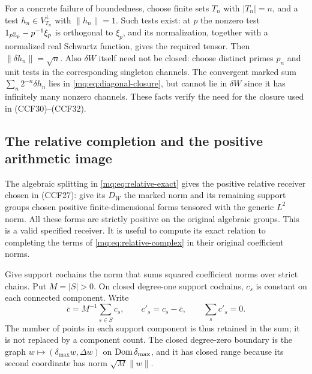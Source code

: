 For a concrete failure of boundedness, choose finite sets $T_n$
with $|T_n|=n$, and a test $h_n\in V_{T_n}^\perp$ with
$\|h_n\|=1$. Such tests exist: at $p$ the nonzero test
$1_{p\mathbb Z_p}-p^{-1}\xi_p$ is orthogonal to $\xi_p$, and its
normalization, together with a normalized real Schwartz function,
gives the required tensor. Then $\|\delta h_n\|=\sqrt n$.
Also $\delta W$ itself need not be closed: choose distinct primes
$p_n$ and unit tests in the corresponding singleton channels.
The convergent marked sum $\sum_n2^{-n}\delta h_n$ lies in
\eqref{mq:eq:diagonal-closure}, but cannot lie in $\delta W$ since
it has infinitely many nonzero channels. These facts verify the
need for the closure used in (CCF30)--(CCF32).

\subsection{The relative completion and the positive arithmetic image}

The algebraic splitting in \eqref{mq:eq:relative-exact} gives the
positive relative receiver chosen in (CCF27): give its $D_W$ the
marked norm and its remaining support groups chosen positive
finite-dimensional forms tensored with the generic $L^2$ norm.
All these forms are strictly positive on the original algebraic
groups. This is a valid specified receiver. It is useful to compute
its exact relation to completing the terms of
\eqref{mq:eq:relative-complex} in their original coefficient norms.

Give support cochains the norm that sums squared coefficient norms
over strict chains. Put $M=|S|>0$. On closed degree-one support
cochains, $c_s$ is constant on each connected component. Write
\[
 \bar c=M^{-1}\sum_{s\in S}c_s,\qquad
 c'_s=c_s-\bar c,\qquad \sum_sc'_s=0.
 \tag{MQ23}\label{mq:eq:support-mean}
\]
The number of points in each support component is thus retained
in the sum; it is not replaced by a component count. The closed
degree-zero boundary is the graph
$w\mapsto(\delta_{\max}w,\Delta w)$ on
$\operatorname{Dom}\delta_{\max}$, and it has closed range because its
second coordinate has norm $\sqrt M\|w\|$.

